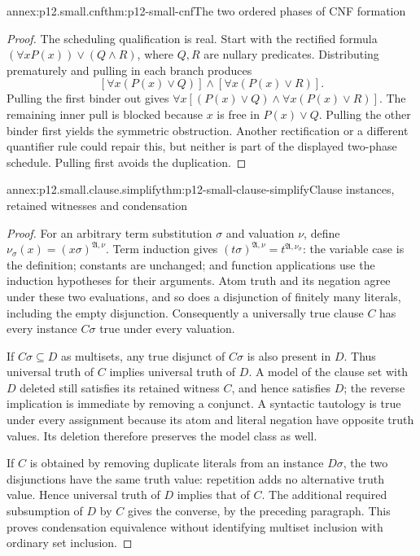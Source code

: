 \begin{annexitem}{annex:p12.small.cnf}{thm:p12-small-cnf}{The two ordered phases of CNF formation}
\begin{proof}
The scheduling qualification is real. Start with the rectified
formula \((\forall x P(x))\lor(Q\land R)\), where \(Q,R\)
are nullary predicates. Distributing prematurely and pulling in
each branch produces
\[
 [\forall x(P(x)\lor Q)]\land
 [\forall x(P(x)\lor R)].
\]
Pulling the first binder out gives
\(\forall x[(P(x)\lor Q)\land\forall x(P(x)\lor R)]\).
The remaining inner pull is blocked because \(x\) is free in
\(P(x)\lor Q\). Pulling the other binder first yields the
symmetric obstruction. Another rectification or a different
quantifier rule could repair this, but neither is part of the
displayed two-phase schedule. Pulling first avoids the duplication.
\end{proof}
\end{annexitem}

\begin{annexitem}{annex:p12.small.clause.simplify}{thm:p12-small-clause-simplify}{Clause instances, retained witnesses and condensation}
\begin{proof}
For an arbitrary term substitution \(\sigma\) and valuation
\(\nu\), define \(\nu_\sigma(x)=(x\sigma)^{\mathfrak A,\nu}\).
Term induction gives
\((t\sigma)^{\mathfrak A,\nu}=t^{\mathfrak A,\nu_\sigma}\):
the variable case is the definition; constants are unchanged;
and function applications use the induction hypotheses for their
arguments. Atom truth and its negation agree under these two
evaluations, and so does a disjunction of finitely many literals,
including the empty disjunction. Consequently a universally true
clause \(C\) has every instance \(C\sigma\) true under every
valuation.

If \(C\sigma\subseteq D\) as multisets, any true disjunct of
\(C\sigma\) is also present in \(D\). Thus universal truth
of \(C\) implies universal truth of \(D\). A model of the
clause set with \(D\) deleted still satisfies its retained witness
\(C\), and hence satisfies \(D\); the reverse implication is
immediate by removing a conjunct. A syntactic tautology is true
under every assignment because its atom and literal negation
have opposite truth values. Its deletion therefore preserves
the model class as well.

If \(C\) is obtained by removing duplicate literals from an
instance \(D\sigma\), the two disjunctions have the same truth
value: repetition adds no alternative truth value. Hence universal
truth of \(D\) implies that of \(C\). The additional required
subsumption of \(D\) by \(C\) gives the converse, by the
preceding paragraph. This proves condensation equivalence without
identifying multiset inclusion with ordinary set inclusion.


\end{proof}
\end{annexitem}
